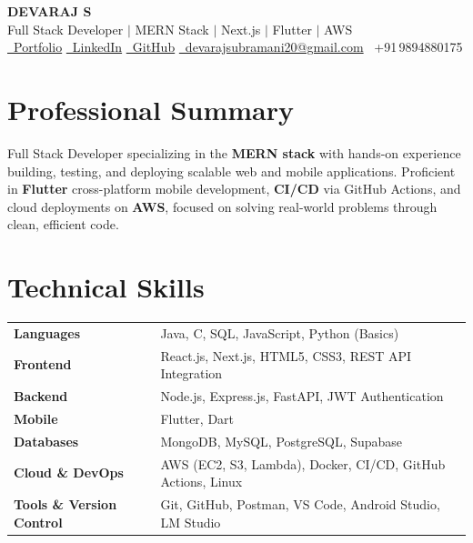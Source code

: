 \documentclass[a4paper,9pt]{article}
\begin{document}
\pagestyle{empty}

\begin{center}
  {\Large \textbf{DEVARAJ S}}\\[4pt]
  {\small Full Stack Developer $|$ MERN Stack $|$ Next.js $|$ Flutter $|$ AWS}\\[5pt]
  \small
  \href{https://devaraj-07.github.io/Portfolio/}{\faGlobe\ Portfolio} \;\;
  \href{https://linkedin.com/in/devarajvetrii}{\faLinkedin\ LinkedIn} \;\;
  \href{https://github.com/DEVARAJ-07}{\faGithub\ GitHub} \;\;
  \href{mailto:devarajsubramani20@gmail.com}{\faEnvelope\ devarajsubramani20@gmail.com} \;\;
  \faMobile\ +91\,9894880175
\end{center}

\vspace{4pt}

\section{Professional Summary}
{\small
Full Stack Developer specializing in the \textbf{MERN stack} with hands-on experience building, testing, and deploying scalable web and mobile applications.
Proficient in \textbf{Flutter} cross-platform mobile development, \textbf{CI/CD} via GitHub Actions, and cloud deployments on \textbf{AWS}, focused on solving real-world problems through clean, efficient code.
}

\section{Technical Skills}
{\small
\begin{tabularx}{\linewidth}{@{} l X @{}}
  \textbf{Languages}               & Java, C, SQL, JavaScript, Python (Basics) \\[2pt]
  \textbf{Frontend}                & React.js, Next.js, HTML5, CSS3, REST API Integration \\[2pt]
  \textbf{Backend}                 & Node.js, Express.js, FastAPI, JWT Authentication \\[2pt]
  \textbf{Mobile}                  & Flutter, Dart \\[2pt]
  \textbf{Databases}               & MongoDB, MySQL, PostgreSQL, Supabase \\[2pt]
  \textbf{Cloud \& DevOps}         & AWS (EC2, S3, Lambda), Docker, CI/CD, GitHub Actions, Linux \\[2pt]
  \textbf{Tools \& Version Control}& Git, GitHub, Postman, VS Code, Android Studio, LM Studio \\
\end{tabularx}
}
\end{document}
